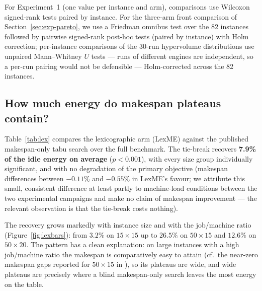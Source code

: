 \documentclass[preprint,12pt]{elsarticle}
\begin{document}
For Experiment~1 (one value per instance and arm), comparisons use
Wilcoxon signed-rank tests paired by instance. For the three-arm front
comparison of Section~\ref{sec:exp-pareto}, we use a Friedman omnibus test
over the 82 instances followed by pairwise signed-rank post-hoc tests
(paired by instance) with Holm correction; per-instance comparisons of the
30-run hypervolume distributions use unpaired Mann--Whitney $U$ tests
--- runs of different engines are independent, so a per-run pairing would
not be defensible --- Holm-corrected across the 82 instances.

\subsection{How much energy do makespan plateaus contain?}
\label{sec:exp-lex}

Table~\ref{tab:lex} compares the lexicographic arm (LexME) against the
published makespan-only tabu search over the full benchmark. The
tie-break recovers \textbf{7.9\% of the idle energy on average}
($p<0.001$), with every size group individually significant, and with no
degradation of the primary objective (makespan differences between
$-0.11\%$ and $-0.55\%$ in LexME's favour; we attribute this small,
consistent difference at least partly to machine-load conditions between
the two experimental campaigns and make no claim of makespan improvement
--- the relevant observation is that the tie-break costs nothing).

The recovery grows markedly with instance size and with the job/machine
ratio (Figure~\ref{fig:lexbars}): from $3.2\%$ on $15{\times}15$ up to
$\mathbf{26.5\%}$ on $50{\times}15$ and $12.6\%$ on $50{\times}20$. The pattern has a clean
explanation: on large instances with a high job/machine ratio the makespan
is comparatively easy to attain (cf.\ the near-zero makespan gaps reported
for $50{\times}15$ in \cite{DiazTabu2026}), so its plateaus are wide, and
wide plateaus are precisely where a blind makespan-only search leaves the
most energy on the table.
\end{document}
